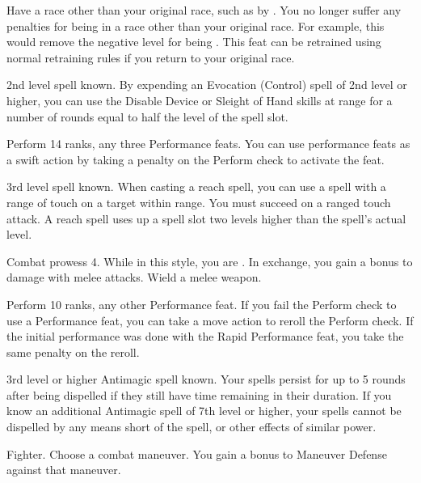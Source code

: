 \label{Racial Acclimation}
\featpre Have a race other than your original race, such as by .
\featben You no longer suffer any penalties for being in a race other than your original race.
For example, this would remove the negative level for being .
This feat can be retrained using normal retraining rules if you return to your original race.

\featpre 2nd level spell known.
\featben By expending an Evocation (Control) spell of 2nd level or higher, you can use the Disable Device or Sleight of Hand skills at \rngclose range for a number of rounds equal to half the level of the spell slot.

\featpres Perform 14 ranks, any three Performance feats.
\featben You can use performance feats as a swift action by taking a  penalty on the Perform check to activate the feat.

\featpre 3rd level spell known.
\featben When casting a reach spell, you can use a spell with a range of touch on a target within \rngclose range.
You must succeed on a ranged touch attack.
A reach spell uses up a spell slot two levels higher than the spell's actual level.

\featpre Combat prowess 4.
\featben While in this style, you are .
In exchange, you gain a  bonus to damage with melee attacks.
\stylereq Wield a melee weapon.

\featpres Perform 10 ranks, any other Performance feat.
\featben If you fail the Perform check to use a Performance feat, you can take a move action to reroll the Perform check.
If the initial performance was done with the Rapid Performance feat, you take the same  penalty on the reroll.

\featpre 3rd level or higher Antimagic spell known.
\featben Your spells persist for up to 5 rounds after being dispelled if they still have time remaining in their duration.
If you know an additional Antimagic spell of 7th level or higher, your spells cannot be dispelled by any means short of the  spell, or other effects of similar power.

\featpre Fighter.
\featben Choose a combat maneuver.
You gain a  bonus to Maneuver Defense against that maneuver.

